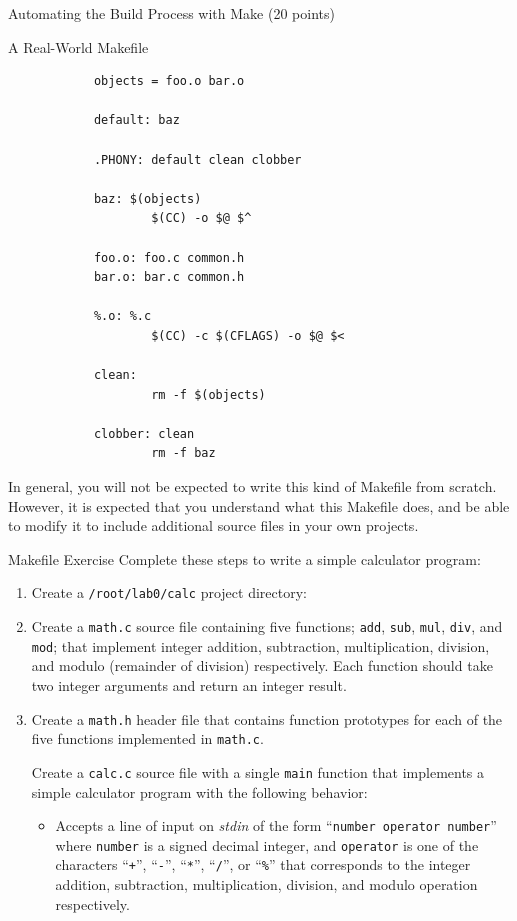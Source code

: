 \documentclass{article}
\begin{document}
\begin{section}{Automating the Build Process with Make (20 points)}
\begin{subsection}{A Real-World Makefile}
\begin{verbatim}
			objects = foo.o bar.o

			default: baz

			.PHONY: default clean clobber

			baz: $(objects)
			        $(CC) -o $@ $^

			foo.o: foo.c common.h
			bar.o: bar.c common.h

			%.o: %.c
			        $(CC) -c $(CFLAGS) -o $@ $<

			clean:
			        rm -f $(objects)

			clobber: clean
			        rm -f baz
			\end{verbatim}
			In general, you will not be expected to write this kind of Makefile from
			scratch.  However, it is expected that you understand what this Makefile
			does, and be able to modify it to include additional source files in your
			own projects.
		\end{subsection}

		\begin{subsection}{Makefile Exercise}
			Complete these steps to write a simple calculator program:
			\begin{enumerate}
				\item Create a \texttt{/root/lab0/calc} project directory:

				\item Create a \texttt{math.c} source file containing five functions;
				      \texttt{add}, \texttt{sub}, \texttt{mul}, \texttt{div}, and
				      \texttt{mod}; that implement integer addition, subtraction,
				      multiplication, division, and modulo (remainder of division)
				      respectively.  Each function should take two integer arguments and
				      return an integer result.

				\item Create a \texttt{math.h} header file that contains function
				      prototypes for each of the five functions implemented in
				      \texttt{math.c}.

				\begin{item}
					Create a \texttt{calc.c} source file with a single \texttt{main} function
					that implements a simple calculator program with the following behavior:

					\begin{itemize}
						\item Accepts a line of input on \emph{stdin} of the form
						      ``\verb|number operator number|'' where \texttt{number} is a signed
						      decimal integer, and \texttt{operator} is one of the characters
						      ``\texttt{+}'', ``\texttt{-}'', ``\texttt{*}'', ``\texttt{/}'', or
						      ``\texttt{\%}'' that corresponds to the integer addition,
						      subtraction, multiplication, division, and modulo operation
						      respectively.


\end{itemize}
\end{item}
\end{enumerate}
\end{subsection}
\end{section}
\end{document}
